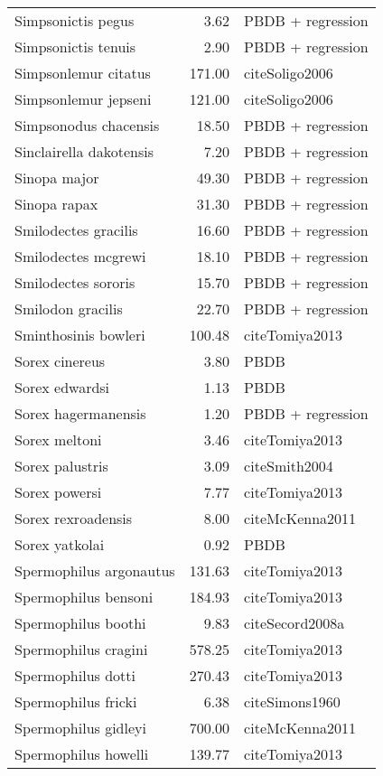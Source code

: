 \begin{table}[ht]
\begin{tabular}{lrl}
  Simpsonictis pegus & 3.62 & PBDB + regression \\ 
  Simpsonictis tenuis & 2.90 & PBDB + regression \\ 
  Simpsonlemur citatus & 171.00 & cite{Soligo2006} \\ 
  Simpsonlemur jepseni & 121.00 & cite{Soligo2006} \\ 
  Simpsonodus chacensis & 18.50 & PBDB + regression \\ 
  Sinclairella dakotensis & 7.20 & PBDB + regression \\ 
  Sinopa major & 49.30 & PBDB + regression \\ 
  Sinopa rapax & 31.30 & PBDB + regression \\ 
  Smilodectes gracilis & 16.60 & PBDB + regression \\ 
  Smilodectes mcgrewi & 18.10 & PBDB + regression \\ 
  Smilodectes sororis & 15.70 & PBDB + regression \\ 
  Smilodon gracilis & 22.70 & PBDB + regression \\ 
  Sminthosinis bowleri & 100.48 & cite{Tomiya2013} \\ 
  Sorex cinereus & 3.80 & PBDB \\ 
  Sorex edwardsi & 1.13 & PBDB \\ 
  Sorex hagermanensis & 1.20 & PBDB + regression \\ 
  Sorex meltoni & 3.46 & cite{Tomiya2013} \\ 
  Sorex palustris & 3.09 & cite{Smith2004} \\ 
  Sorex powersi & 7.77 & cite{Tomiya2013} \\ 
  Sorex rexroadensis & 8.00 & cite{McKenna2011} \\ 
  Sorex yatkolai & 0.92 & PBDB \\ 
  Spermophilus argonautus & 131.63 & cite{Tomiya2013} \\ 
  Spermophilus bensoni & 184.93 & cite{Tomiya2013} \\ 
  Spermophilus boothi & 9.83 & cite{Secord2008a} \\ 
  Spermophilus cragini & 578.25 & cite{Tomiya2013} \\ 
  Spermophilus dotti & 270.43 & cite{Tomiya2013} \\ 
  Spermophilus fricki & 6.38 & cite{Simons1960} \\ 
  Spermophilus gidleyi & 700.00 & cite{McKenna2011} \\ 
  Spermophilus howelli & 139.77 & cite{Tomiya2013} \\ 

\end{tabular}
\end{table}
